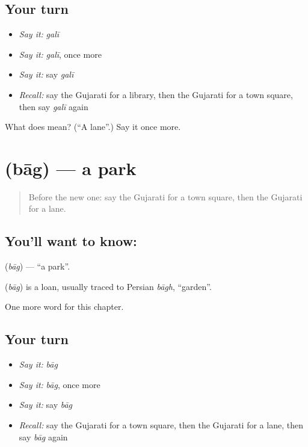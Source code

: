 \subsection*{Your turn}
\begin{itemize}
\raggedright
  \item \emph{Say it:} \emph{galī}
  \item \emph{Say it:} \emph{galī}, once more
  \item \emph{Say it:} say \emph{galī}
  \item \emph{Recall:} say the Gujarati for a library, then the Gujarati for a town square, then say \emph{galī} again
\end{itemize}

\begin{tcolorbox}[breakable,colback=teal!4,colframe=teal!35!black,title={Before you move on}]
What does  mean? (\textquotedblleft{}A lane\textquotedblright{}.) Say it once more.
\end{tcolorbox}
\section[\texorpdfstring{\gu{બાગ} (bāg)}{બાગ (bāg)}]{ (bāg) — a park}

\label{lesson:GU-C129-bag}



\begin{quote}
Before the new one: say the Gujarati for a town square, then the Gujarati for a lane.
\end{quote}

\subsection*{You'll want to know: }
\textbf{} (\emph{bāg}) — \textquotedblleft{}a park\textquotedblright{}.

\begin{cousinweb}
\textbf{} (\emph{bāg}) is a loan, usually traced to Persian \emph{bāgh}, \textquotedblleft{}garden\textquotedblright{}.
\end{cousinweb}

\begin{grammarlens}[title={What you've built}]
One more word for this chapter.
\end{grammarlens}

\subsection*{Your turn}
\begin{itemize}
\raggedright
  \item \emph{Say it:} \emph{bāg}
  \item \emph{Say it:} \emph{bāg}, once more
  \item \emph{Say it:} say \emph{bāg}
  \item \emph{Recall:} say the Gujarati for a town square, then the Gujarati for a lane, then say \emph{bāg} again
\end{itemize}

